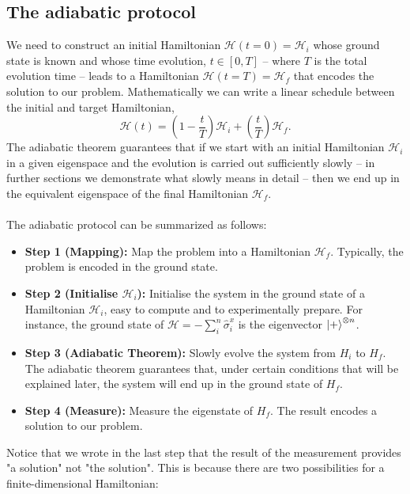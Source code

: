 \subsection{The adiabatic protocol}
We need to construct an initial Hamiltonian $\mathcal{H}(t=0) = \mathcal{H}_{i}$ whose ground state is known and whose time evolution, $t \in \left[0,T\right]$ -- where $T$ is the total evolution time -- leads to a Hamiltonian $\mathcal{H}(t=T) = \mathcal{H}_{f}$ that encodes the solution to our problem. Mathematically we can write a linear schedule between the initial and target Hamiltonian,
\begin{equation}
\label{eq:Htime}
    \mathcal{H}(t) = \left(1-\frac{t}{T}\right)\mathcal{H}_{i} + \left(\frac{t}{T} \right)\mathcal{H}_{f}.
\end{equation}
The adiabatic theorem guarantees that if we start with an initial Hamiltonian $\mathcal{H}_{i}$ in a given eigenspace and the evolution is carried out sufficiently slowly -- in further sections we demonstrate what slowly means in detail -- then we end up in the equivalent eigenspace of the final Hamiltonian $\mathcal{H}_{f}$. \\\\
The adiabatic protocol can be summarized as follows:
\begin{itemize}
    \item \textbf{Step 1 (Mapping):} Map the problem into a Hamiltonian $\mathcal{H}_{f}$. Typically, the problem is encoded in the ground state.
    \item \textbf{Step 2 (Initialise $\mathcal{H}_{i}$):} Initialise the system in the ground state of a Hamiltonian $\mathcal{H}_{i}$, easy to compute and to experimentally prepare. For instance, the ground state of $\mathcal{H} = - \sum_{i}^{n}\hat{\sigma}_{i}^{x}$ is the eigenvector $\ket{+}^{\otimes n}$.
    \item \textbf{Step 3 (Adiabatic Theorem):} Slowly evolve the system from $H_{i}$ to $H_{f}$. The adiabatic theorem guarantees that, under certain conditions that will be explained later, the system will end up in the ground state of $H_{f}$.
    \item \textbf{Step 4 (Measure):} Measure the eigenstate of $H_{f}$. The result encodes a solution to our problem.
\end{itemize}
Notice that we wrote in the last step that the result of the measurement provides "a solution" not "the solution". This is because there are two possibilities for a finite-dimensional Hamiltonian:
